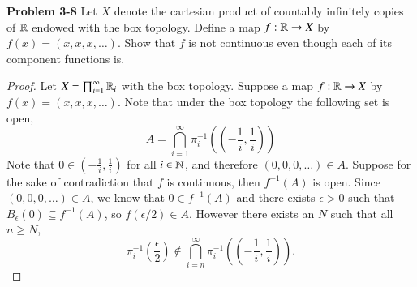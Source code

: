 \documentclass[minion]{homework651}
\begin{document}
\begin{problems}
\problem\textbf{Problem 3-8} Let $X$ denote the cartesian product of countably infinitely copies of $\mathbb R$
endowed with the box topology. Define a map $f: \mathbb R \to X$ by $f(x) = (x, x, x, \dots)$. Show that $f$ is 
not continuous even though each of its component functions is. 
\begin{proof} Let $X = \prod_{i = 1}^{\infty} \mathbb R_i$ with the box topology. Suppose a map $f: \mathbb R \to X$ by $f(x) = (x, x, x, \dots)$. 
    Note that under the box topology the following set is open, 
    \begin{equation*}
        A = \bigcap_{i = 1}^{\infty} \pi^{-1}_i\left(\left(-\frac{1}{i}, \frac{1}{i}\right)\right)
    \end{equation*}
    Note that $0 \in \left(-\frac{1}{i}, \frac{1}{i}\right)$ for all $i \in \mathbb N$, and therefore $(0,0,0,\dots) \in A$. 
    Suppose for the sake of contradiction that $f$ is continuous, then $f^{-1}(A)$ is open. Since $(0,0,0,\dots) \in A$, we know that $0 \in f^{-1}(A)$
    and there exists $\epsilon > 0$ such that $B_{\epsilon}(0) \subseteq f^{-1}(A)$, so $f(\epsilon/2) \in A$. However there exists an $N$ such that all $n \geq N$, 
    \begin{equation*}
       \pi_i^{-1}\left(\frac{\epsilon}{2}\right) \not\in \bigcap_{i = n}^{\infty} \pi^{-1}_i\left(\left(-\frac{1}{i}, \frac{1}{i}\right)\right).
    \end{equation*}


    
\end{proof}




\end{problems}
\end{document}
